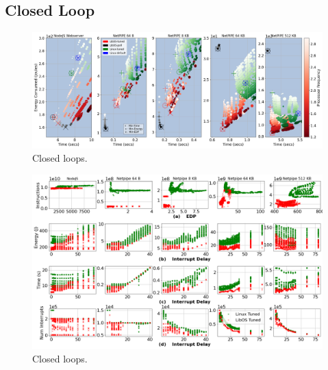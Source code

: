 \subsection{Closed Loop}
\label{sec:closed_loop}
\begin{figure}
\centering
\includegraphics[width=1\textwidth]{figures/closed_loop_overview.png}
\vspace*{-4mm}
\caption[]
{Closed loops.}
\label{fig:closed_loop_overview}
\end{figure}
\begin{figure}
\centering
\includegraphics[width=1\textwidth]{figures/closed_detail_1.png}
\vspace*{-4mm}
\caption[]
{Closed loops.}
\label{fig:closed_loop_detail_1}
\end{figure}

